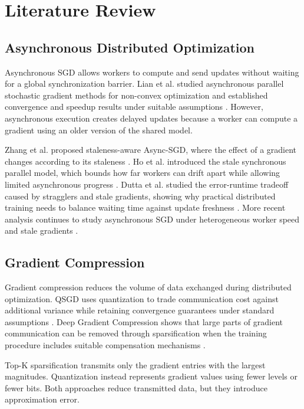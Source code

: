\documentclass[conference]{IEEEtran}
\begin{document}
\section{Literature Review}

\subsection{Asynchronous Distributed Optimization}

Asynchronous SGD allows workers to compute and send updates without waiting for a global synchronization barrier. Lian et al. studied asynchronous parallel stochastic gradient methods for non-convex optimization and established convergence and speedup results under suitable assumptions \cite{lian2015async}. However, asynchronous execution creates delayed updates because a worker can compute a gradient using an older version of the shared model.

Zhang et al. proposed staleness-aware Async-SGD, where the effect of a gradient changes according to its staleness \cite{zhang2016staleness}. Ho et al. introduced the stale synchronous parallel model, which bounds how far workers can drift apart while allowing limited asynchronous progress \cite{ho2013ssp}. Dutta et al. studied the error-runtime tradeoff caused by stragglers and stale gradients, showing why practical distributed training needs to balance waiting time against update freshness \cite{dutta2018stale}. More recent analysis continues to study asynchronous SGD under heterogeneous worker speed and stale gradients \cite{islamov2024asgrad}.

\subsection{Gradient Compression}

Gradient compression reduces the volume of data exchanged during distributed optimization. QSGD uses quantization to trade communication cost against additional variance while retaining convergence guarantees under standard assumptions \cite{alistarh2017qsgd}. Deep Gradient Compression shows that large parts of gradient communication can be removed through sparsification when the training procedure includes suitable compensation mechanisms \cite{lin2018dgc}.

Top-K sparsification transmits only the gradient entries with the largest magnitudes. Quantization instead represents gradient values using fewer levels or fewer bits. Both approaches reduce transmitted data, but they introduce approximation error.
\end{document}
